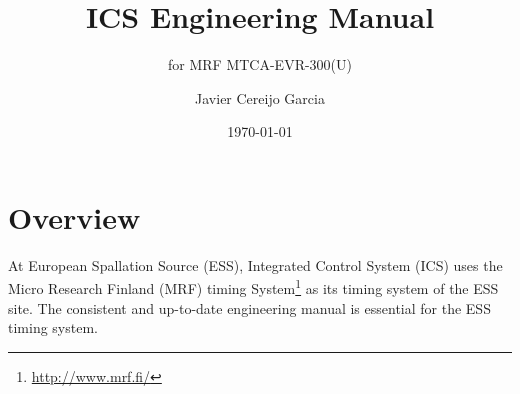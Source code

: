 \documentclass[11pt
  , a4paper
  , article
  , oneside
  , showtrims
]{memoir}
\begin{document}
%

%

%
\date{\today}

%

%

%

%
\title{ICS Engineering Manual}
\subtitle{for MRF MTCA-EVR-300(U)}
\author{Javier Cereijo Garcia}





\showtrimson

\esstitle
\newpage
\tableofcontents
\newpage



\chapter{Overview}
At European Spallation Source (ESS), Integrated Control System (ICS) uses the Micro Research Finland (MRF) timing System{\footnote{\url{http://www.mrf.fi/}}} as its timing system of the ESS site. The consistent and up-to-date engineering manual is essential for the ESS timing system.\\
\end{document}

